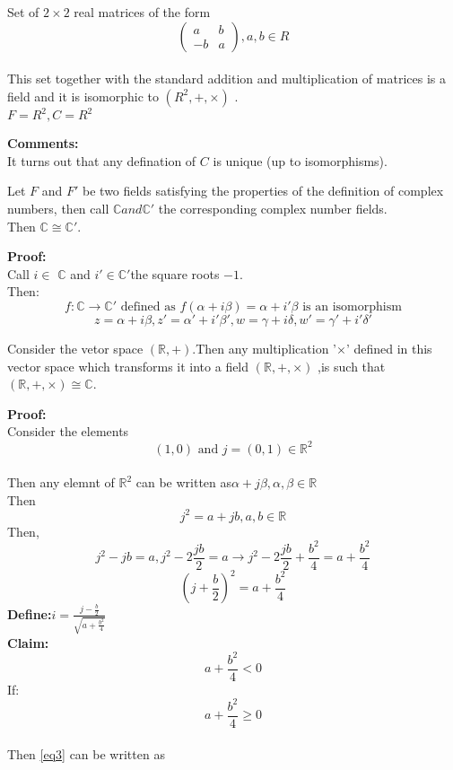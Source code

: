 \begin{example}[exercise]{}
Set of $ 2\times 2 $  real matrices of the form 
$$
    \begin{pmatrix}
        a & b\\
        -b & a
    \end{pmatrix}, a,b \in R $$
    \\This set together with the standard addition and multiplication of matrices is a field and it is isomorphic to $ (R^2,+,\times) $ . 
\\$ F=R^2,C=R^2 $ 
\end{example}
\textbf{Comments:}  
\\It turns out that any defination of $ C $ is unique (up to isomorphisms).
\begin{lemma}{}{}
Let $ F $ and $ F' $ be two fields satisfying the properties of the definition of complex numbers, then call $\mathbb{C} and \mathbb{C}'$ the corresponding complex number fields.
\\Then $ \mathbb{C} \cong \mathbb{C}' $.
\end{lemma}
\textbf{Proof:}
\\Call $ i \in $ $\mathbb{C}$ and $ i' \in  \mathbb{C}' $the square roots $ -1 $.
\\Then:
    $$
        f: \mathbb{C} \rightarrow \mathbb{C}' \text{  defined as  } f(\alpha +i\beta)=\alpha +i'\beta \text{  is an isomorphism}
    $$ 
$$
    z=\alpha +i\beta, z'=\alpha '+i'\beta', w=\gamma  +i\delta , w'=\gamma '+i'\delta'
$$ 
\begin{lemma}{}{}
Consider the vetor space $ (\mathbb{R},+)$.Then any multiplication '$ \times $' defined in this vector space which transforms it into a field $ (\mathbb{R},+,\times) $ ,is such that $ (\mathbb{R},+,\times) \cong \mathbb{C} $.  

\end{lemma}
\textbf{Proof:}
\\Consider the elements$$
    (1,0) \text{    and   } j=(0,1) \in \mathbb{R}^2
$$ 
\\Then any elemnt of $ \mathbb{R}^2 $ can be written as$ \alpha +j\beta ,\alpha ,\beta \in \mathbb{R}$
\\Then$$
    j^2=a+jb, a,b \in \mathbb{R}
$$ Then,
$$
    j^2-jb=a, j^2-2\frac{jb}{2}=a \rightarrow j^2-2\frac{jb}{2}+\frac{b^2}{4}=a+\frac{b^2}{4}
$$ 
\begin{equation}
    {(j+\frac{b}{2})}^2=a+\frac{b^2}{4}  \label{eq3}
\end{equation}
\textbf{Define:}$ i=\frac{j-\frac{b}{2}}{\sqrt{a+\frac{b^2}{4}}} $ 
\\\textbf{Claim:}
$$
    a+\frac{b^2}{4}<0
$$ 
If:$$
    a+\frac{b^2}{4} \geq 0
$$ 
\\Then \eqref{eq3} can be written as

